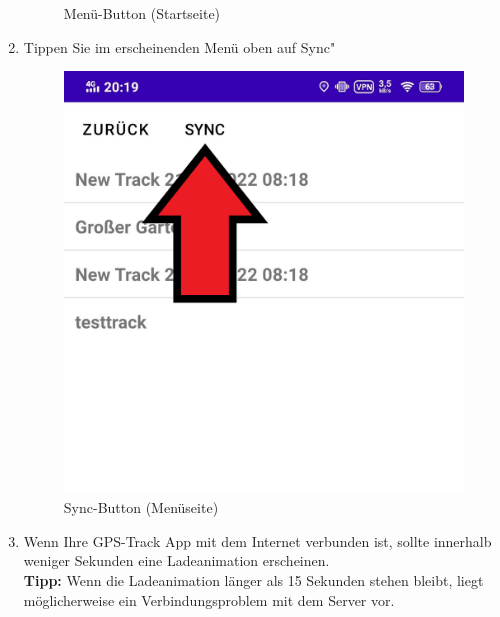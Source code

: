 \documentclass{article}
\begin{document}
\begin{enumerate}
\begin{figure}[H]
            \centering
            \caption{Menü-Button (Startseite)}
        \end{figure}
        \item Tippen Sie im erscheinenden Menü oben auf \glqq Sync" 
        \begin{figure}[H]
            \includegraphics[scale=0.15]{2.png}
            \centering
            \caption{Sync-Button (Menüseite)}
        \end{figure}
        \item Wenn Ihre GPS-Track App mit dem Internet verbunden ist, sollte innerhalb weniger Sekunden eine
         Ladeanimation erscheinen.
        \\\textbf{Tipp:} Wenn die Ladeanimation länger als 15 Sekunden stehen bleibt, liegt möglicherweise ein Verbindungsproblem mit dem Server vor.
        \begin{figure}[H]

\end{figure}
\end{enumerate}
\end{document}
